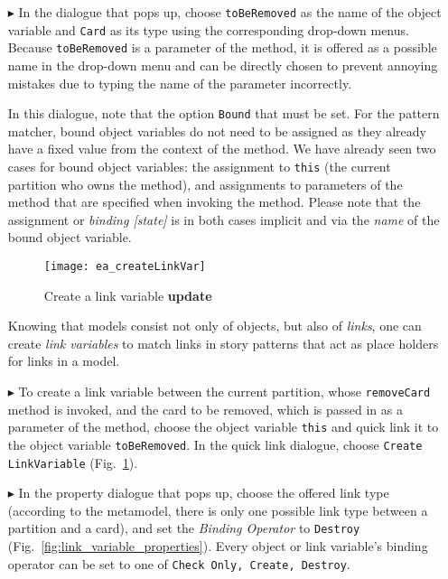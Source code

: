 \begin{itemize}
\item[$\blacktriangleright$] In the dialogue that pops up, choose \texttt{toBeRemoved} as the name of the object variable and \texttt{Card} as its type using
the corresponding drop-down menus. Because \texttt{toBeRemoved} is a parameter of the method, it is offered as a possible name in the drop-down menu and can be
directly chosen to prevent annoying mistakes due to typing the name of the parameter incorrectly.

In this dialogue, note that the option \texttt{Bound} that must be set. For the pattern matcher, bound object variables do not need
to be assigned as they already have a fixed value from the context of the method.   We have already seen two cases  for bound object variables: the assignment
to \texttt{this} (the current partition who owns the method), and assignments to parameters of the method that  are specified when invoking
the method.   Please note that the assignment or \emph{binding [state]} is in both cases implicit and via the \emph{name} of the bound
object variable.

\begin{figure}[htp]
\begin{center}
  \texttt{[image: ea\_createLinkVar]}
  \caption{Create a link variable {\bf update}}   
  \label{fig:link_variable}
\end{center}
\end{figure}

Knowing that models consist not only of objects, but also of \emph{links}, one can create \emph{link variables} to match links in story
patterns that act as place holders for links in a model.

\item[$\blacktriangleright$] To create a link variable between the current partition, whose \texttt{removeCard} method is invoked, and the
card to be removed, which is passed in as a parameter of the method, choose the object variable \texttt{this} and quick link it to the object variable
\texttt{toBeRemoved}. In the quick link dialogue, choose \texttt{Create LinkVariable} (Fig.~\ref{fig:link_variable}).

\item[$\blacktriangleright$] In the property dialogue that pops up, choose the offered link type (according to the metamodel, there is only one possible link
type between a partition and a card), and set the \emph{Binding Operator} to \texttt{Destroy}
(Fig.~\ref{fig:link_variable_properties}). Every object or link variable's binding operator can be set to one of \texttt{Check Only, Create, Destroy}.


\end{itemize}
